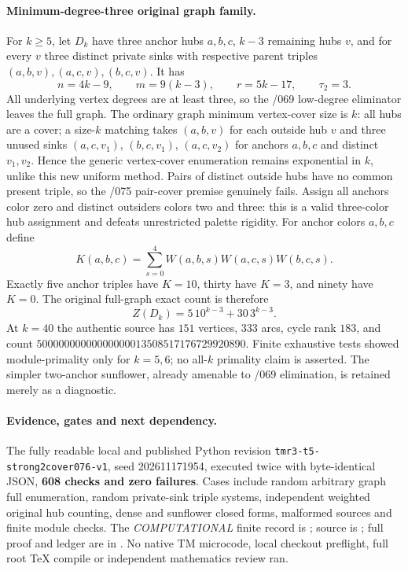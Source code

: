 \documentclass[11pt]{article}
\begin{document}
\paragraph{Minimum-degree-three original graph family.}
For $k\ge5$, let $D_k$ have three anchor hubs $a,b,c$,
$k-3$ remaining hubs $v$, and for every $v$ three
distinct private sinks with respective parent triples
$(a,b,v),(a,c,v),(b,c,v)$. It has
\[
 n=4k-9,\qquad m=9(k-3),\qquad r=5k-17,
 \qquad \tau_2=3.
\]
All underlying vertex degrees are at least three, so
the /069 low-degree eliminator leaves the full graph.
The ordinary graph minimum vertex-cover size is $k$:
all hubs are a cover; a size-$k$ matching takes
$(a,b,v)$ for each outside hub $v$ and three unused
sinks $(a,c,v_1)$, $(b,c,v_1)$, $(a,c,v_2)$
for anchors $a,b,c$ and distinct $v_1,v_2$.
Hence the generic vertex-cover enumeration remains
exponential in $k$, unlike this new uniform method.
Pairs of distinct outside hubs have no common present triple,
so the /075 pair-cover premise genuinely fails.
Assign all anchors color zero and distinct outsiders
colors two and three: this is a valid three-color hub
assignment and defeats unrestricted palette rigidity.
For anchor colors $a,b,c$ define
\[
 K(a,b,c)=\sum_{s=0}^4
 W(a,b,s)W(a,c,s)W(b,c,s).
\]
Exactly five anchor triples have $K=10$,
thirty have $K=3$, and ninety have $K=0$.
The original full-graph exact count is therefore
\[
 \boxed{Z(D_k)=5\,10^{k-3}+30\,3^{k-3}.}
\]
At $k=40$ the authentic source has $151$ vertices,
$333$ arcs, cycle rank $183$, and count
$50000000000000000013508517176729920890$.
Finite exhaustive tests showed module-primality only
for $k=5,6$; no all-$k$ primality claim is asserted.
The simpler two-anchor sunflower, already amenable
to /069 elimination, is retained merely as a diagnostic.

\paragraph{Evidence, gates and next dependency.}
The fully readable local and published Python revision
\texttt{tmr3-t5-strong2cover076-v1},
seed 202611171954, executed twice with byte-identical
JSON, \textbf{608 checks and zero failures}.
Cases include random arbitrary graph full enumeration,
random private-sink triple systems, independent
weighted original hub counting, dense and sunflower
closed forms, malformed sources and finite module checks.
The \emph{COMPUTATIONAL} finite record is
;
source is
;
full proof and ledger are in
.
No native TM microcode, local checkout preflight, full
root TeX compile or independent mathematics review ran.
\end{document}
